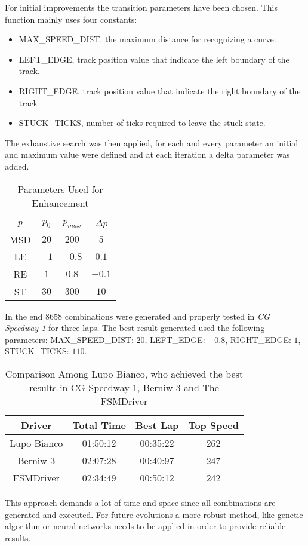 For initial improvements the transition parameters have been chosen. This function mainly uses four constants:
\begin{itemize}
\item MAX\_SPEED\_DIST, the maximum distance for recognizing a curve.
\item LEFT\_EDGE, track position value that indicate the left boundary of the track.
\item RIGHT\_EDGE, track position value that indicate the right boundary of the track
\item STUCK\_TICKS, number of ticks required to leave the stuck state.
\end{itemize}

The exhaustive search was then applied, for each and every parameter an initial and maximum value were defined and at each iteration a delta parameter was added.

\begin{table}[h]
\renewcommand{\arraystretch}{1.3}
\caption{Parameters Used for Enhancement}
\label{parameter_table}
\centering
\begin{tabular}{c||c||c||c}
\hline \bfseries $p$ &\bfseries $p_0$ &\bfseries $ p_{max}$ &\bfseries $\Delta p$ \\
\hline
\hline MSD & $20$ & $200$ & $5$ \\ 
\hline LE & $-1$ & $-0.8$ & $0.1$ \\ 
\hline RE & $1$ & $0.8$ & $-0.1$ \\ 
\hline ST & $30$ & $300$ & $10$ \\ 
\hline 
\end{tabular} 
\end{table}

In the end 8658 combinations were generated and properly tested in \textit{CG Speedway 1}
for three laps. The best result generated used the following parameters: MAX\_SPEED\_DIST: $20$, LEFT\_EDGE: $-0.8$, RIGHT\_EDGE: $1$, STUCK\_TICKS: $110$.

\begin{table}[h]
\renewcommand{\arraystretch}{1.3}
\caption{Comparison Among Lupo Bianco, who achieved the best results in CG Speedway 1, Berniw 3 and The FSMDriver}
\label{results_table}
\centering

\begin{tabular}{c||c||c||c}
\hline \bfseries Driver &\bfseries Total Time &\bfseries Best Lap &\bfseries Top Speed \\
\hline
\hline Lupo Bianco & 01:50:12 & 00:35:22 & 262 \\
\hline Berniw 3 & 02:07:28 & 00:40:97 & 247 \\ 
\hline FSMDriver & 02:34:49 & 00:50:12 & 242 \\ 
\hline 
\end{tabular}
\end{table}
This approach demands a lot of time and space since all combinations are generated and executed. For future evolutions a more robust method, like genetic algorithm or neural networks needs to be applied in order to provide reliable results.
